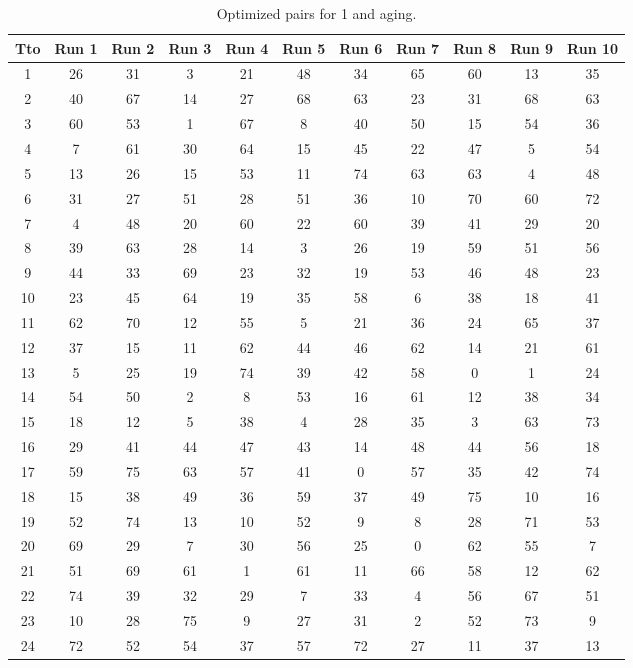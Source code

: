 \begin{table}
  \centering
  \scriptsize
  \caption{Optimized pairs for 1 and aging.}
  \label{tab_pairs}
\begin{tabular}{c c c c c c c c c c c }
\hline
Tto & Run 1 & Run 2 & Run 3 & Run 4 & Run 5 & Run 6 & Run 7 & Run 8 & Run 9 & Run 10 \\
\hline
1 & 26 & 31 & 3 & 21 & 48 & 34 & 65 & 60 & 13 & 35 \\
2 & 40 & 67 & 14 & 27 & 68 & 63 & 23 & 31 & 68 & 63 \\
3 & 60 & 53 & 1 & 67 & 8 & 40 & 50 & 15 & 54 & 36 \\
4 & 7 & 61 & 30 & 64 & 15 & 45 & 22 & 47 & 5 & 54 \\
5 & 13 & 26 & 15 & 53 & 11 & 74 & 63 & 63 & 4 & 48 \\
6 & 31 & 27 & 51 & 28 & 51 & 36 & 10 & 70 & 60 & 72 \\
7 & 4 & 48 & 20 & 60 & 22 & 60 & 39 & 41 & 29 & 20 \\
8 & 39 & 63 & 28 & 14 & 3 & 26 & 19 & 59 & 51 & 56 \\
9 & 44 & 33 & 69 & 23 & 32 & 19 & 53 & 46 & 48 & 23 \\
10 & 23 & 45 & 64 & 19 & 35 & 58 & 6 & 38 & 18 & 41 \\
11 & 62 & 70 & 12 & 55 & 5 & 21 & 36 & 24 & 65 & 37 \\
12 & 37 & 15 & 11 & 62 & 44 & 46 & 62 & 14 & 21 & 61 \\
13 & 5 & 25 & 19 & 74 & 39 & 42 & 58 & 0 & 1 & 24 \\
14 & 54 & 50 & 2 & 8 & 53 & 16 & 61 & 12 & 38 & 34 \\
15 & 18 & 12 & 5 & 38 & 4 & 28 & 35 & 3 & 63 & 73 \\
16 & 29 & 41 & 44 & 47 & 43 & 14 & 48 & 44 & 56 & 18 \\
17 & 59 & 75 & 63 & 57 & 41 & 0 & 57 & 35 & 42 & 74 \\
18 & 15 & 38 & 49 & 36 & 59 & 37 & 49 & 75 & 10 & 16 \\
19 & 52 & 74 & 13 & 10 & 52 & 9 & 8 & 28 & 71 & 53 \\
20 & 69 & 29 & 7 & 30 & 56 & 25 & 0 & 62 & 55 & 7 \\
21 & 51 & 69 & 61 & 1 & 61 & 11 & 66 & 58 & 12 & 62 \\
22 & 74 & 39 & 32 & 29 & 7 & 33 & 4 & 56 & 67 & 51 \\
23 & 10 & 28 & 75 & 9 & 27 & 31 & 2 & 52 & 73 & 9 \\
24 & 72 & 52 & 54 & 37 & 57 & 72 & 27 & 11 & 37 & 13 \\

\end{tabular}
\end{table}
